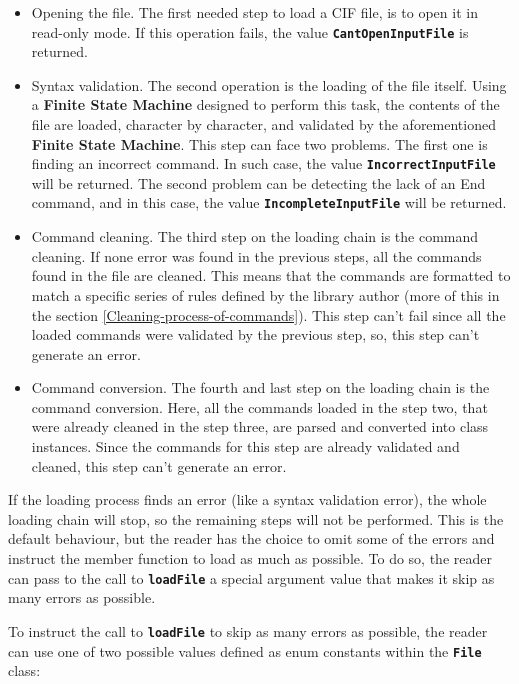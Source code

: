 \documentclass[11pt,twoside,openany,x11names,svgnames]{memoir}
\begin{document}
\begin{itemize}
	\item Opening the file. The first needed step to load a CIF file, is to open it in read-only mode. If this operation fails, the value \textbf{\texttt{CantOpenInputFile}} is returned.
	
	\item Syntax validation. The second operation is the loading of the file itself. Using a  \textbf{Finite State Machine} designed to perform this task, the contents of the file are loaded, character by character, and validated by the aforementioned \textbf{Finite State Machine}. This step can face two problems. The first one is finding an incorrect command. In such case, the value \textbf{\texttt{IncorrectInputFile}} will be returned. The second problem can be detecting the lack of an End command, and in this case, the value \textbf{\texttt{IncompleteInputFile}} will be returned.
	
	\item Command cleaning. The third step on the loading chain is the command cleaning. If none error was found in the previous steps, all the commands found in the file are cleaned. This means that the commands are formatted to match a specific series of rules defined by the library author (more of this in the section \ref{Cleaning-process-of-commands}). This step can't fail since all the loaded commands were validated by the previous step, so, this step can't generate an error.
	
	\item Command conversion. The fourth and last step on the loading chain is the command conversion. Here, all the commands loaded in the step two, that were already cleaned in the step three, are parsed and converted into class instances. Since the commands for this step are already validated and cleaned, this step can't generate an error.
\end{itemize}

If the loading process finds an error (like a syntax validation error), the whole loading chain will stop, so the remaining steps will not be performed. This is the default behaviour, but the reader has the choice to omit some of the errors and instruct the member function to load as much as possible. To do so, the reader can pass to the call to \textbf{\texttt{loadFile}} a special argument value that makes it skip as many errors as possible.

To instruct the call to \textbf{\texttt{loadFile}} to skip as many errors as possible, the reader can use one of two possible values defined as enum constants within the \textbf{\texttt{File}} class:
\end{document}
